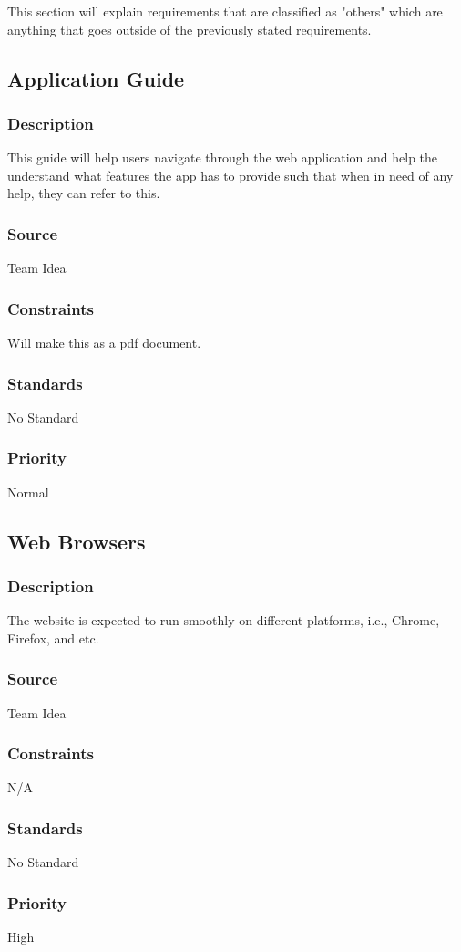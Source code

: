 This section will explain requirements that are classified as "others" which are anything that goes outside of the previously stated requirements.

\subsection{Application Guide}
\subsubsection{Description}
This guide will help users navigate through the web application and help the understand what features the app has to provide such that when in need of any help, they can refer to this.
\subsubsection{Source}
Team Idea
\subsubsection{Constraints}
Will make this as a pdf document.
\subsubsection{Standards}
No Standard
\subsubsection{Priority}
Normal

\subsection{Web Browsers}
\subsubsection{Description}
The website is expected to run smoothly on different platforms, i.e., Chrome, Firefox, and etc.
\subsubsection{Source}
Team Idea
\subsubsection{Constraints}
N/A
\subsubsection{Standards}
No Standard
\subsubsection{Priority}
High